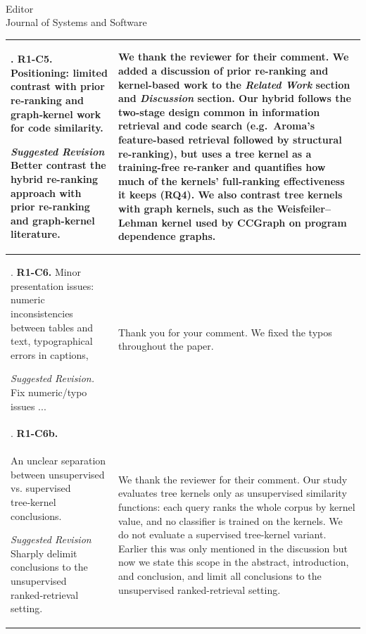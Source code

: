 \documentclass[
pagenumber=false, %
parskip=half, %
fromalign=right, %
foldmarks=false, %
addrfield=false %
]{scrlttr2}
\newcounter{commentcounter} %
\newcommand{\comment}[1]{\refstepcounter{commentcounter}\thecommentcounter.} %
\begin{document}
\begin{letter}{\\Editor\\Journal of Systems and Software}
\begin{longtable}{p{}p{}}
			\\ \midrule
			
			\comment{1} \textbf{R1-C5.} Positioning: limited contrast with prior re‑ranking and graph‑kernel work for code similarity.\newline 
		
			\textit{Suggested Revision} Better contrast the hybrid re-ranking approach with prior re-ranking and graph-kernel literature. & We thank the reviewer for their comment. We added a discussion of prior re-ranking and kernel-based work to the \textit{Related
			Work} section and \textit{Discussion} section. Our hybrid follows the two-stage design common in information retrieval and code search
			(e.g.\ Aroma's feature-based retrieval followed by structural re-ranking), but uses a tree kernel as a training-free re-ranker and quantifies how much of the kernels' full-ranking effectiveness it keeps (RQ4). We also contrast tree kernels with graph kernels, such as
			the Weisfeiler--Lehman kernel used by CCGraph on program dependence graphs. \\ \midrule 
			
			
			\comment{1} \textbf{R1-C6.} Minor presentation issues: numeric inconsistencies between tables and text, typographical errors in captions, \newline
			
			\textit{Suggested Revision.}  Fix numeric/typo issues ... &  Thank you for your comment. We fixed the typos throughout the paper. \\ \midrule 
			
			\comment{1} \textbf{R1-C6b.}\\ An unclear separation between unsupervised vs. supervised tree‑kernel conclusions.\newline 
			
			\textit{Suggested Revision} Sharply delimit conclusions to the unsupervised ranked‑retrieval setting.& 
			We thank the reviewer for their comment. Our study evaluates tree kernels only as unsupervised similarity functions:
			each query ranks the whole corpus by kernel value, and no classifier is trained on the kernels. We do not evaluate a supervised tree-kernel variant. Earlier this was only mentioned in the discussion but now we state this scope in the abstract, introduction, and conclusion, and limit all conclusions to the unsupervised ranked-retrieval setting. 	\\ \midrule 
	

\end{longtable}
\end{letter}
\end{document}
